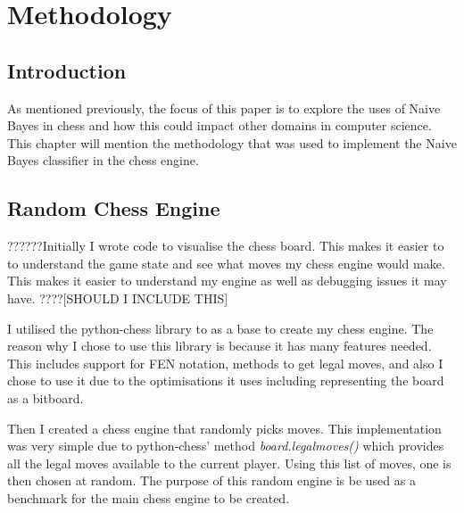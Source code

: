 \chapter{Methodology}

\section{Introduction}
As mentioned previously, the focus of this paper is to explore the uses of Naive Bayes in chess and how this could impact other domains in computer science. This chapter will mention the methodology that was used to implement the Naive Bayes classifier in the chess engine. 

\section{Random Chess Engine}
??????Initially I wrote code to visualise the chess board. This makes it easier to to understand the game state and see what moves my chess engine would make. This makes it easier to understand my engine as well as debugging issues it may have. ????[SHOULD I INCLUDE THIS]

I utilised the python-chess library to as a base to create my chess engine. The reason why I chose to use this library is because it has many features needed. This includes support for FEN notation, methods to get legal moves, and also I chose to use it due to the optimisations it uses including representing the board as a bitboard.

Then I created a chess engine that randomly picks moves. This implementation was very simple due to python-chess' method \textit{board.legalmoves()} which provides all the legal moves available to the current player. Using this list of moves, one is then chosen at random. The purpose of this random engine is be used as a benchmark for the main chess engine to be created.

